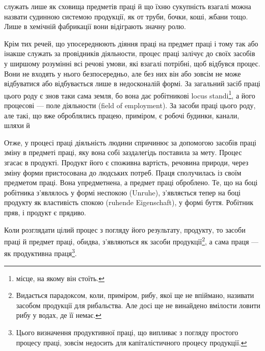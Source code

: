 \parcont{}  %
служать лише як сховища предметів праці й що їхню сукупність
взагалі можна назвати судинною системою продукції, як от
труби, бочки, коші, жбани тощо. Лише в хемічній фабрикації
вони відіграють значну ролю.

Крім тих речей, що упосереднюють діяння праці на предмет
праці і тому так або інакше служать за провідників діяльности,
процес праці залічує до своїх засобів у ширшому розумінні всі
речові умови, які взагалі потрібні, щоб відбувся процес. Вони
не входять у нього безпосередньо, але без них він або зовсім
не може відбуватися або відбувається лише в недосконалій формі.
За загальний засіб праці цього роду є знов таки сама земля, бо
вона дає робітникові locus standi\footnote*{
місце, на якому він стоїть. 
}, а його процесові — поле
діяльности (field of employment). За засоби праці цього роду,
але такі, що вже оброблялись працею, приміром, є робочі будинки,
канали, шляхи й~

Отже, у процесі праці діяльність людини спричинює за допомогою
засобів праці зміну в предметі праці, яку вона собі заздалегідь
поставила за мету. Процес згасає в продукті. Продукт його є
споживна вартість, речовина природи, через зміну форми пристосована
до людських потреб. Праця сполучилась із своїм предметом
праці. Вона упредметнена, а предмет праці оброблено. Те, що
на боці робітника з’являлось у формі неспокою (Unruhe), з’являється
тепер на боці продукту як властивість спокою (ruhende
Eigenschaft), у формі буття. Робітник пряв, і продукт є прядиво.

Коли розглядати цілий процес з погляду його результату,
продукту, то засоби праці й предмет праці, обидва, з’являються
як засоби продукції\footnote{
Видається парадоксом, коли, приміром, рибу, якої ще не впіймано,
називати засобом продукції для рибальства. Але досі ще не винайдено
вмілости ловити рибу у водах, де її немає.
}, а сама праця — як продуктивна праця\footnote{
Цього визначення продуктивної праці, що випливає з погляду простого
процесу праці, зовсім недосить для капіталістичного процесу продукції.
}.

